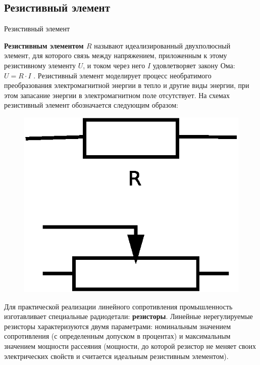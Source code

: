 \documentclass[12pt, pdf, hyperref={unicode},handout]{beamer}
\begin{document}
\subsection{Резистивный элемент}
\begin{frame}{Резистивный элемент}
  \begin{block}

    \small{
\textbf{Резистивным элементом $R$} называют идеализированный двухполюсный элемент,
для которого связь между напряжением, приложенным к этому резистивному элементу $U$, и током через него $I$ удовлетворяет закону Ома: $U=R\cdot I$ .
Резистивный элемент моделирует процесс необратимого преобразования электромагнитной
энергии в тепло и другие виды энергии, при этом запасание энергии в электромагнитном поле отсутствует.
На схемах резистивный элемент обозначается следующим образом:
\begin{figure}[htb] 
    \centering
    \includegraphics [scale=0.6]{ris12.eps}
  \end{figure}
  Для практической реализации линейного сопротивления промышленность изготавливает специальные радиодетали: \textbf{резисторы}. Линейные нерегулируемые резисторы характеризуются двумя параметрами: номинальным значением сопротивления (с определенным допуском в процентах) и максимальным значением мощности рассеяния (мощности, до которой резистор не меняет своих электрических свойств и считается идеальным резистивным элементом).
}

  \end{block}
  
\end{frame}
\end{document}
